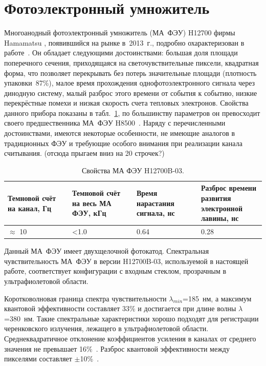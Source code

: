 \section{Фотоэлектронный умножитель}\label{section:secMapmt}

Многоанодный фотоэлектронный умножитель (МА~ФЭУ) H12700 фирмы Hamamatsu \cite{}, появившийся на рынке в~2013~г., подробно охарактеризован в работе~\cite{}. Он обладает следующими достоинствами: большая доля площади поперечного сечения, приходящаяся на светочувствительные пиксели, квадратная форма, что позволяет перекрывать без потерь значительные площади (плотность упаковки~87\%), малое время прохождения однофотоэлектронного сигнала через динодную систему, малый разброс этого времени от события к событию, низкие перекрёстные помехи и низкая скорость счета тепловых электронов. Свойства данного прибора показаны в табл.~\ref{tabl:MAPMT}, по большинству параметров он превосходит своего предшественника МА~ФЭУ H8500~\cite{}. Наряду с перечисленными достоинствами, имеются некоторые особенности, не имеющие аналогов в традиционных ФЭУ и требующие особого внимания при реализации канала считывания. (отсюда прыгаем вниз на 20 строчек?)

\begin{table}[h]
\caption{Свойства МА ФЭУ H12700B-03.}
\label{tabl:MAPMT}
\begin{tabular}{ | p{0.25\linewidth} | p{0.25\linewidth} | p{0.25\linewidth} | p{0.25\linewidth} | }
	\hline
	Темновой счёт на канал, Гц & Темновой счёт на весь МА ФЭУ, кГц & Время нарастания сигнала, нс & Разброс времени развития электронной лавины, нс\\
	\hline
	$ \approx $ 10 & <1.0 & 0.64 & 0.28\\
	\hline
\end{tabular}
\end{table}

Данный МА~ФЭУ имеет двухщелочной фотокатод. Спектральная чувствительность МА~ФЭУ в версии H12700B-03, используемой в настоящей работе, соответствует конфигурации с входным стеклом, прозрачным в ультрафиолетовой области.

Коротковолновая граница спектра чувствительности $ \lambda_{min} $=185~нм, а максимум квантовой эффективности составляет 33\% и достигается при длине волны $ \lambda $=380~нм. Такие спектральные характеристики хорошо подходят для регистрации черенковского излучения, лежащего в ультрафиолетовой области. Среднеквадратичное отклонение коэффициентов усиления в каналах от среднего значения не превышает 16\%~\cite{}. Разброс квантовой эффективности между пикселями составляет $ \pm $10\%~\cite{}.

